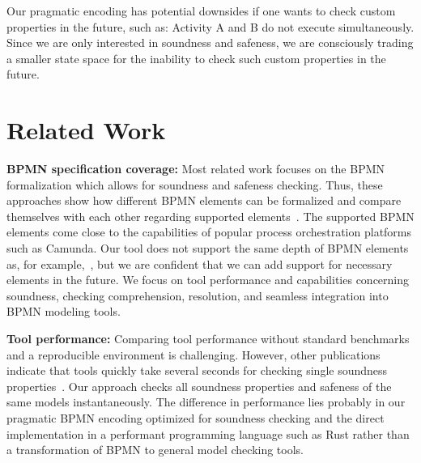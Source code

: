 \documentclass[runningheads]{llncs}
\begin{document}
Our pragmatic encoding has potential downsides if one wants to check custom properties in the future, such as: Activity A and B do not execute simultaneously.
Since we are only interested in soundness and safeness, we are consciously trading a smaller state space for the inability to check such custom properties in the future.

\section{Related Work}

\textbf{BPMN specification coverage:}
Most related work focuses on the BPMN formalization which allows for soundness and safeness checking.
Thus, these approaches show how different BPMN elements can be formalized and compare themselves with each other regarding supported elements~\cite{corradiniFormalApproachAnalysis2021,houhouFirstOrderLogicVerification2022,krauterFormalizationAnalysisBPMN2023,krauterHigherorderTransformationApproach2023}.
The supported BPMN elements come close to the capabilities of popular process orchestration platforms such as Camunda.
Our tool does not support the same depth of BPMN elements as, for example,~\cite {krauterFormalizationAnalysisBPMN2023}, but we are confident that we can add support for necessary elements in the future.
We focus on tool performance and capabilities concerning soundness, checking comprehension, resolution, and seamless integration into BPMN modeling tools.

\textbf{Tool performance:}
Comparing tool performance without standard benchmarks and a reproducible environment is challenging.
However, other publications indicate that tools quickly take several seconds for checking single soundness properties~\cite{corradiniFormalApproachAnalysis2021,houhouFirstOrderLogicVerification2022,krauterHigherorderTransformationApproach2023}.
Our approach checks all soundness properties and safeness of the same models instantaneously.
The difference in performance lies probably in our pragmatic BPMN encoding optimized for soundness checking and the direct implementation in a performant programming language such as Rust rather than a transformation of BPMN to general model checking tools.
\end{document}
